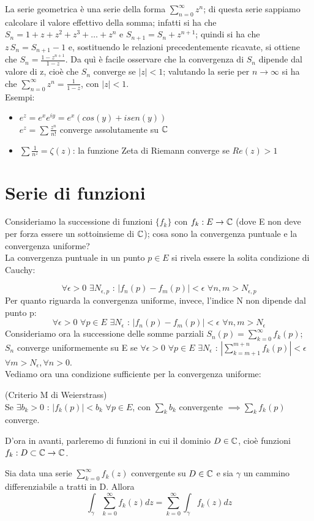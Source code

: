 La serie geometrica è una serie della forma $\sum_{n=0} ^{\infty} z^n$; di questa serie sappiamo calcolare il valore effettivo della somma; infatti si ha che $S_n=1+z+z^2+z^3+ \dots +z^n$ e $S_{n+1}=S_n + z^{n+1}$; quindi si ha che $z \, S_n=S_{n+1} -1$ e, sostituendo le relazioni precedentemente ricavate, si ottiene che $S_n=\frac{1-z^{n+1}}{1-z}$. Da quì è facile osservare che la convergenza di $S_n$ dipende dal valore di z, cioè che $S_n$ converge se $|z|<1$; valutando la serie per $n \to \infty$ si ha che $\sum_{n=0} ^{\infty} z^n=\frac{1}{1-z}$, con $|z|<1$.
\\Esempi:
\begin{itemize}
\item $e^z =e^x e^{iy}=e^x (cos(y)+i sen(y))$ \\$e^z=\sum \frac{z^n}{n!}$ converge assolutamente su $\mathbb{C}$
\item $\sum \frac{1}{n^z} = \zeta(z)$: la funzione Zeta di Riemann converge se $Re(z)>1$
\end{itemize}

\section{Serie di funzioni}

Consideriamo la successione di funzioni $\{f_k\}$ con $f_k:E \to \mathbb{C}$ (dove E non deve per forza essere un sottoinsieme di $\mathbb{C}$); cosa sono la convergenza puntuale e la convergenza uniforme? \\La convergenza puntuale in un punto $p \in E$ si rivela essere la solita condizione di Cauchy:

$$\forall \epsilon >0 \, \, \exists N_{\epsilon, p} \text{ : } |f_n(p) -f_m(p)| < \epsilon \, \, \forall n,m>N_{\epsilon, p}$$ 
Per quanto riguarda la convergenza uniforme, invece, l'indice N non dipende dal punto p:
$$\forall \epsilon >0 \,\, \forall p \in E \, \, \exists N_{\epsilon} \text{ : } |f_n(p) -f_m(p)| < \epsilon \, \, \forall n,m>N_{\epsilon}$$
Consideriamo ora la successione delle somme parziali $S_n(p)=\sum_{k=0} ^{\infty} f_k(p)$; $S_n$ converge uniformemente su E se $\forall \epsilon >0 \, \, \forall p \in E \, \, \exists N_{\epsilon}$ : $|\sum_{k=m+1} ^{m+n} f_k(p)| < \epsilon$ $\forall m>N_{\epsilon}, \forall n>0$.
\\Vediamo ora una condizione sufficiente per la convergenza uniforme:
\begin{teorema} (Criterio M di Weierstrass)\\
Se $\exists b_k>0$ : $|f_k(p)|<b_k$ $\forall p \in E$, con $\sum_k b_k$ convergente $\implies \sum_k f_k(p)$ converge.
\end{teorema}
D'ora in avanti, parleremo di funzioni in cui il dominio $D \in \mathbb{C}$, cioè funzioni $f_k:D \subset \mathbb{C} \to \mathbb{C}$.
\begin{teorema}
Sia data una serie $\sum_{k=0} ^{\infty} f_k(z)$ convergente su $D \in \mathbb{C}$ e sia $\gamma$ un cammino differenziabile a tratti in D. Allora 
$$\int_{\gamma} \sum_{k=0} ^{\infty} f_k(z) dz=\sum_{k=0} ^{\infty} \int_{\gamma} f_k(z) dz$$
\end{teorema}

